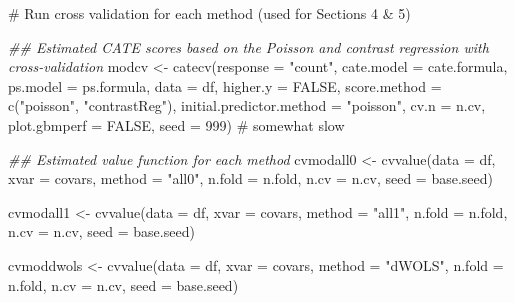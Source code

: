 \documentclass[
  letterpaper,
  DIV=11,
  numbers=noendperiod]{scrreprt}
\newenvironment{Shaded}{\begin{snugshade}}{\end{snugshade}}
\newcommand{\AttributeTok}[1]{\textcolor[rgb]{0.40,0.45,0.13}{#1}}
\newcommand{\CommentTok}[1]{\textcolor[rgb]{0.37,0.37,0.37}{#1}}
\newcommand{\ConstantTok}[1]{\textcolor[rgb]{0.56,0.35,0.01}{#1}}
\newcommand{\DecValTok}[1]{\textcolor[rgb]{0.68,0.00,0.00}{#1}}
\newcommand{\DocumentationTok}[1]{\textcolor[rgb]{0.37,0.37,0.37}{\textit{#1}}}
\newcommand{\FunctionTok}[1]{\textcolor[rgb]{0.28,0.35,0.67}{#1}}
\newcommand{\NormalTok}[1]{\textcolor[rgb]{0.00,0.23,0.31}{#1}}
\newcommand{\OtherTok}[1]{\textcolor[rgb]{0.00,0.23,0.31}{#1}}
\newcommand{\StringTok}[1]{\textcolor[rgb]{0.13,0.47,0.30}{#1}}
\begin{document}
\begin{Shaded}
\begin{Highlighting}[]
\CommentTok{\# Run cross validation for each method (used for Sections 4 \& 5)}
  
\DocumentationTok{\#\# Estimated CATE scores based on the Poisson and contrast regression with cross{-}validation}
\NormalTok{modcv }\OtherTok{\textless{}{-}} \FunctionTok{catecv}\NormalTok{(}\AttributeTok{response =} \StringTok{"count"}\NormalTok{,}
                \AttributeTok{cate.model =}\NormalTok{ cate.formula,}
                \AttributeTok{ps.model =}\NormalTok{ ps.formula,}
                \AttributeTok{data =}\NormalTok{ df,}
                \AttributeTok{higher.y =} \ConstantTok{FALSE}\NormalTok{,}
                \AttributeTok{score.method =} \FunctionTok{c}\NormalTok{(}\StringTok{"poisson"}\NormalTok{, }\StringTok{"contrastReg"}\NormalTok{),}
                \AttributeTok{initial.predictor.method =} \StringTok{"poisson"}\NormalTok{,}
                \AttributeTok{cv.n =}\NormalTok{ n.cv,}
                \AttributeTok{plot.gbmperf =} \ConstantTok{FALSE}\NormalTok{,}
                \AttributeTok{seed =} \DecValTok{999}\NormalTok{) }\CommentTok{\# somewhat slow}

\DocumentationTok{\#\# Estimated value function for each method}
\NormalTok{cvmodall0 }\OtherTok{\textless{}{-}} \FunctionTok{cvvalue}\NormalTok{(}\AttributeTok{data =}\NormalTok{ df, }\AttributeTok{xvar =}\NormalTok{ covars,}
                     \AttributeTok{method =} \StringTok{"all0"}\NormalTok{, }\AttributeTok{n.fold =}\NormalTok{ n.fold, }\AttributeTok{n.cv =}\NormalTok{ n.cv, }
                     \AttributeTok{seed =}\NormalTok{ base.seed)}

\NormalTok{cvmodall1 }\OtherTok{\textless{}{-}} \FunctionTok{cvvalue}\NormalTok{(}\AttributeTok{data =}\NormalTok{ df, }\AttributeTok{xvar =}\NormalTok{ covars,}
                     \AttributeTok{method =} \StringTok{"all1"}\NormalTok{, }\AttributeTok{n.fold =}\NormalTok{ n.fold, }\AttributeTok{n.cv =}\NormalTok{ n.cv, }
                     \AttributeTok{seed =}\NormalTok{ base.seed)}

\NormalTok{cvmoddwols }\OtherTok{\textless{}{-}} \FunctionTok{cvvalue}\NormalTok{(}\AttributeTok{data =}\NormalTok{ df, }\AttributeTok{xvar =}\NormalTok{ covars,}
                      \AttributeTok{method =} \StringTok{"dWOLS"}\NormalTok{, }\AttributeTok{n.fold =}\NormalTok{ n.fold, }\AttributeTok{n.cv =}\NormalTok{ n.cv, }
                      \AttributeTok{seed =}\NormalTok{ base.seed)}


\end{Highlighting}
\end{Shaded}
\end{document}
